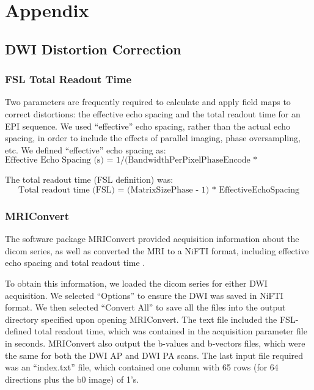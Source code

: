 
\section{Appendix}
\label{sec:Appendix}

\subsection{DWI Distortion Correction}
\label{sec:distortion}

\subsubsection{FSL Total Readout Time}

Two parameters are frequently required to calculate and apply field maps to correct distortions: the effective echo spacing and the total readout time for an EPI sequence.  We used ``effective'' echo spacing, rather than the actual echo spacing, in order to include the effects of parallel imaging, phase oversampling, etc. We defined ``effective'' echo spacing as:
\[
\text{Effective Echo Spacing (s) = 1/(BandwidthPerPixelPhaseEncode * MatrixSizePhase)}
\]

The total readout time (FSL definition) was:
\[
\text{Total readout time (FSL) = (MatrixSizePhase - 1) * EffectiveEchoSpacing}
\]

\subsubsection{MRIConvert}

The software package MRIConvert provided acquisition information about the dicom series, as well as converted the MRI to a NiFTI format, including effective echo spacing and total readout time \cite{ref:mriconvert}. 

To obtain this information, we loaded the dicom series for either DWI acquisition. We selected ``Options'' to ensure the DWI was saved in NiFTI format. We then selected ``Convert All'' to save all the files into the output directory specified upon opening MRIConvert. The text file included the FSL-defined total readout time, which was contained in the acquisition parameter file in seconds. MRIConvert also output the b-values and b-vectors files, which were the same for both the DWI AP and DWI PA scans. The last input file required was an ``index.txt'' file, which contained one column with 65 rows (for 64 directions plus the b0 image) of 1's.

